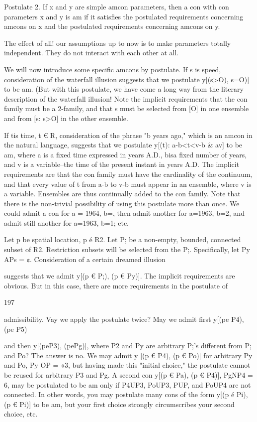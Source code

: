 \documentclass[10pt,twoside]{memoir}
\begin{document}
\begin{enumerate}
{\begin{enumerate}
\begin{sysrules}
\begin{sysrules}
\begin{sysrules}
\begin{sysrules}
{\begin{enumerate}
{{{{{{{{{{Postulate 2. If x and y are simple amcon parameters, then a con with con 
parameters x and y is am if it satisfies the postulated requirements 
concerning amcons on x and the postulated requirements concerning amcons 
on y. 

The effect of all! our assumptions up to now is to make parameters 
totally independent. They do not interact with each other at all. 

We will now introduce some specific amcons by postulate. If s is speed, 
consideration of the waterfall illusion suggests that we postulate y[(s>O), 
{s=O)] to be am. (But with this postulate, we have come a long way from 
the literary description of the waterfall illusion! } Note the implicit 
requirements that the con family must be a 2-family, and that s must be 
selected from [O] in one ensemble and from [s: s>O] in the other ensemble. 

If tis time, t € R, consideration of the phrase "b years ago," which is an 
amcon in the natural language, suggests that we postulate y[(t): a-b<t<v-b & 
av] to be am, where a is a fixed time expressed in years A.D., bisa fixed 
number of years, and v is a variable--the time of the present instant in years 
A.D. The implicit requirements are that the con family must have the 
cardinality of the continuum, and that every value of t from a-b to v-b must 
appear in an ensemble, where v is a variable. Ensembles are thus continually 
added to the con family. Note that there is the non-trivial possibility of using 
this postulate more than once. We could admit a con for a = 1964, b=, 
then admit another for a=1963, b=2, and admit stifl another for a=1963, 
b=1; etc. 

Let p be spatial location, p é R2. Let P; be a non-empty, bounded, 
connected subset of R2. Restriction subsets will be selected from the P;. 
Specifically, let Py APs = ¢. Consideration of a certain dreamed illusion 


suggests that we admit y[(p € P;), (p € Py)]. The implicit requirements are 
obvious. But in this case, there are more requirements in the postulate of 


197 


admissibility. Vay we apply the postulate twice? May we admit first y[(pe 
P4), (pe P5)} and then y[(peP3), (pePg)], where P2 and Py are arbitrary 
P;'s different from P; and Po? The answer is no. We may admit y [(p € P4), 
(p € Po)] for arbitrary Py and Po, Py OP = «3, but having made this "initial 
choice," the postulate cannot be reused for arbitrary P3 and Pg. A second 
con y[(p € Pa), (p € P4)], PgNP4 = 6, may be postulated to be am only if 
P4UP3, PoUP3, PUP, and PoUP4 are not connected. In other words, you 
may postulate many cons of the form y[(p é Pi), (p € Pi)] to be am, but 
your first choice strongly circumscribes your second choice, etc. 

}}}}}}}}}
\end{enumerate}}
\end{sysrules}
\end{sysrules}
\end{sysrules}
\end{sysrules}
\end{enumerate}}
\end{enumerate}
\end{document}

